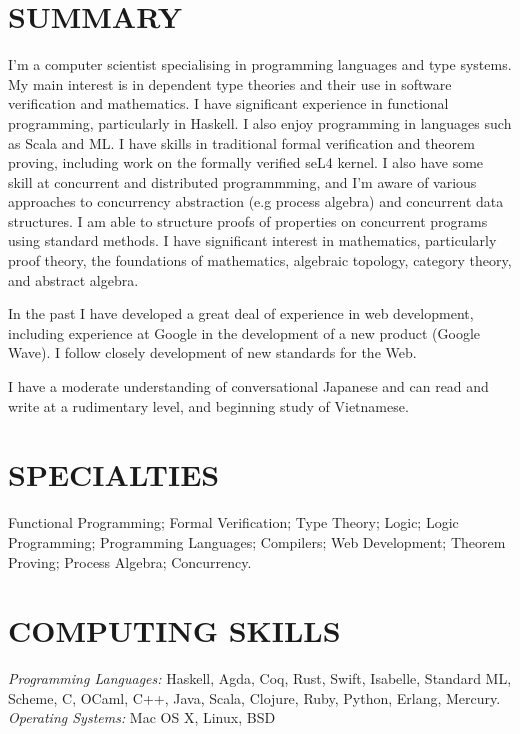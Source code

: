 \documentclass[line,margin]{res}
\begin{document}

 
\begin{resume}
 
\section{SUMMARY}
I'm a computer scientist specialising in programming languages and type systems. My main interest is in dependent type theories and their use in software verification and mathematics. I have significant experience in functional programming, particularly in Haskell. I also enjoy programming in languages such as Scala and ML. I have skills in traditional formal verification and theorem proving, including work on the formally verified seL4 kernel. I also have some skill at concurrent and distributed programmming, and I'm aware of various approaches to concurrency abstraction (e.g process algebra) and concurrent data structures. I am able to structure proofs of properties on concurrent programs using standard methods. I have significant interest in mathematics, particularly proof theory, the foundations of mathematics, algebraic topology, category theory, and abstract algebra.

In the past I have developed a great deal of experience in web development, including experience at Google in the development of a new product (Google Wave). I follow closely development of new standards for the Web.

I have a moderate understanding of conversational Japanese and can read and write at a rudimentary level, and beginning study of Vietnamese.

\section{SPECIALTIES} Functional Programming; Formal Verification; Type Theory; Logic; Logic Programming; Programming Languages; Compilers; Web Development; Theorem Proving; Process Algebra; Concurrency.

\section{COMPUTING SKILLS} {\sl Programming Languages:} Haskell, Agda, Coq, Rust, Swift,
         Isabelle, Standard ML, Scheme, C, OCaml, C++, 
         Java, Scala, Clojure, Ruby, Python, 
         Erlang, Mercury. \\
         {\sl Operating Systems:} Mac OS X, Linux, BSD


\end{resume}
\end{document}

